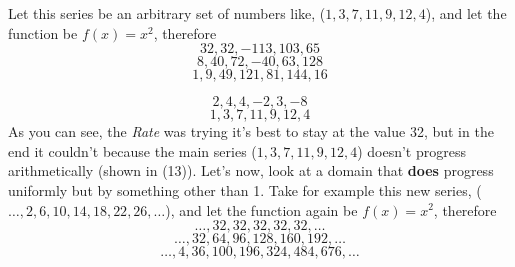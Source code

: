 \documentclass[12pt, letterpaper]{report}
\begin{document}
\noindent
Let this series be an arbitrary set of numbers like, ($1, 3, 7, 11, 9, 12, 4$), and let the function be $f(x)=x^2$, therefore
$$32, 32, -113, 103, 65$$
$$8, 40, 72, -40, 63, 128$$
\begin{equation}1, 9, 49, 121, 81, 144, 16\end{equation}

$$2, 4, 4, -2, 3, -8$$
\begin{equation}1, 3, 7, 11, 9, 12, 4\end{equation}
As you can see, the \textit{Rate} was trying it's best to stay at the value 32, but in the end it couldn't because the main series ($1, 3, 7, 11, 9, 12, 4$) doesn't progress arithmetically (shown in (13)). Let's now, look at a domain that \textbf{does} progress uniformly but by something other than 1. Take for example this new series, ($\dots, 2, 6, 10, 14, 18, 22, 26, \dots$), and let the function again be $f(x)=x^2$, therefore
$$\dots, 32, 32, 32, 32, 32, \dots$$
$$\dots, 32, 64, 96, 128, 160, 192, \dots$$
\begin{equation}\dots, 4, 36, 100, 196, 324, 484, 676, \dots\end{equation}
\end{document}
